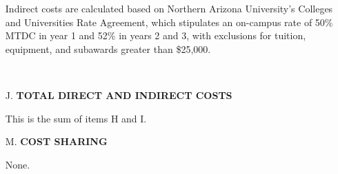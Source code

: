 \documentclass[11pt]{article}
\begin{document}
\begin{enumerate}[leftmargin=*]
Indirect costs are calculated based on Northern Arizona University's Colleges and Universities Rate Agreement, which stipulates an on-campus rate of 50\% MTDC in year 1 and 52\% in years 2 and 3, with exclusions for tuition, equipment, and subawards greater than \$25,000.

\ \hfill {}

\item[J.] \textbf{TOTAL DIRECT AND INDIRECT COSTS}

This is the sum of items H and I. \hfill {}

\item[M.] \textbf{COST SHARING}

None. \hfill {}

\end{enumerate}
\end{document}
